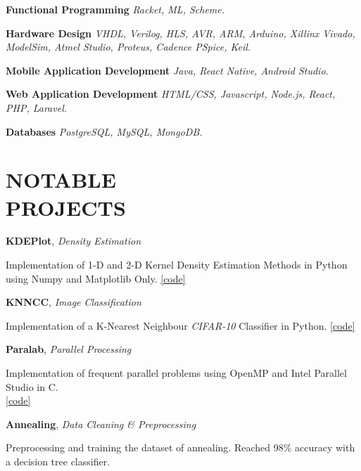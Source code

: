 \documentclass[margin, 10pt]{res} %
\begin{document}
	\textbf{Functional Programming}
	\textit{Racket, ML, Scheme.}

	\textbf{Hardware Design}
	\textit{VHDL, Verilog, HLS, AVR, ARM, Arduino, Xillinx Vivado, ModelSim, Atmel Studio, Proteus, Cadence PSpice, Keil.}
	
	\textbf{Mobile Application Development}
	\textit{Java, React Native, Android Studio.}
	
	
	\textbf{Web Application Development}
	\textit{HTML/CSS, Javascript, Node.js, React, PHP, Laravel.}
	
	\textbf{Databases}
	\textit{PostgreSQL, MySQL, MongoDB.}

\section{NOTABLE \\ PROJECTS}

	\textbf{KDEPlot}, 
\textit{Density Estimation}
\begin{innerlist}
	\item Implementation of 1-D and 2-D Kernel Density Estimation Methods in Python using Numpy and Matplotlib Only.
	\hfill{\UrlFont\href{https://github.com/aligholamee/KDEPlot}{[code]}}
\end{innerlist}

	\textbf{KNNCC}, 
	\textit{Image Classification}
	\begin{innerlist}
		\item Implementation of a K-Nearest Neighbour \textit{CIFAR-10} Classifier in Python.
		\hfill{\UrlFont\href{https://github.com/aligholamee/KNNCC}{[code]}}
	\end{innerlist}

\textbf{Paralab}, 
\textit{Parallel Processing}
\begin{innerlist}
	\item Implementation of frequent parallel problems using OpenMP and Intel Parallel Studio in C.\\ \phantom{km}
	\hfill{\UrlFont\href{https://github.com/aligholamee/ParaLab/tree/master}{[code]}}
\end{innerlist}

\textbf{Annealing}, 
\textit{Data Cleaning \& Preprocessing}
\begin{innerlist}
	\item Preprocessing and training the dataset of annealing. Reached 98\% accuracy with a decision tree classifier.\\ \phantom{km}
	\hfill{}
\end{innerlist}
\end{document}
